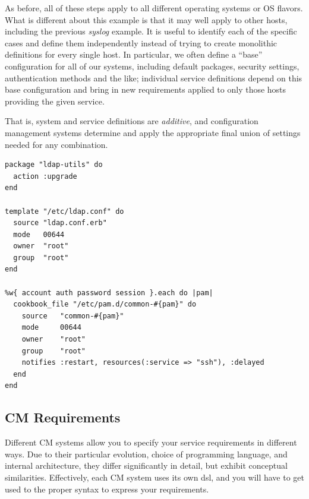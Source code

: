 As before, all of these steps apply to all different
operating systems or OS flavors.  What is different
about this example is that it may well apply to other
hosts, including the previous {\em syslog} example.
It is useful to identify each of the specific cases
and define them independently instead of trying to
create monolithic definitions for every single host.
In particular, we often define a ``base''
configuration for all of our systems, including
default packages, security settings, authentication
methods and the like; individual service definitions
depend on this base configuration and bring in new
requirements applied to only those hosts providing the
given service.

That is, system and service definitions are {\em
additive}, and configuration management systems
determine and apply the appropriate final union of
settings needed for any combination. \\


\begin{minipage}{.9\linewidth}
\begin{lstlisting}[basicstyle=\scriptsize,label=code:cm:ldap,caption={[Excerpt
of an LDAP client authentication Chef
``recipe'']Excerpt of a Chef ``recipe'' defining LDAP
client authentication configuration. Note the
conceptual similarities to the Puppet DSL shown
earlier.}]
package "ldap-utils" do
  action :upgrade
end

template "/etc/ldap.conf" do
  source "ldap.conf.erb"
  mode   00644
  owner  "root"
  group  "root"
end

%w{ account auth password session }.each do |pam|
  cookbook_file "/etc/pam.d/common-#{pam}" do
    source   "common-#{pam}"
    mode     00644
    owner    "root"
    group    "root"
    notifies :restart, resources(:service => "ssh"), :delayed
  end
end
\end{lstlisting}
\end{minipage}

\subsection{CM Requirements}
\label{configuration-management:defining-services:requirements}

Different CM systems allow you to specify your service
requirements in different ways.  Due to their
particular evolution,  choice of programming language,
and internal architecture, they differ
significantly in detail, but exhibit conceptual
similarities.  Effectively, each CM system uses its
own \gls{dsl}, and you will have to get used to the
proper syntax to express your requirements.

